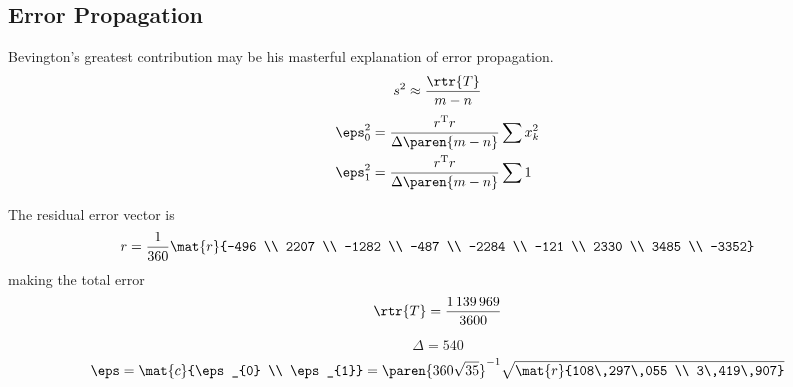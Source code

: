 \subsection{Error Propagation}  %

Bevington's greatest contribution may be his masterful explanation of error propagation.
  \begin{equation*}
    s^{2} \approx \frac{\rtr{T}} {m-n}
  \end{equation*}
\begin{equation*}
  \begin{split}
    \eps_{0}^{2} &= \frac{r^{\mathrm{T}}r}{\Delta\paren{m-n}} \sum x_{k}^{2} \\
    \eps_{1}^{2} &= \frac{r^{\mathrm{T}}r}{\Delta\paren{m-n}} \sum 1 \\
  \end{split}
  \label{eqn:bevington error terms}
\end{equation*}

The residual error vector is
  \begin{equation*}
      r = \frac{1}{360}
          \mat{r}{-496 \\ 2207 \\ -1282 \\ -487 \\ -2284 \\ -121 \\ 2330 \\ 3485 \\ -3352}
  \end{equation*}
making the total error
  \begin{equation*}
      \rtr{T} = \frac{1\,139\,969}{3600}
  \end{equation*}

  \begin{equation*}   %
    \Delta = 540
  \end{equation*}
  \begin{equation*}   %
    \eps = \mat{c}{\eps_{0} \\ \eps_{1}} = 
    \paren{360\sqrt{35}}^{-1}
    \sqrt{ \mat{r}{108\,297\,055 \\ 3\,419\,907} }
  \end{equation*}
